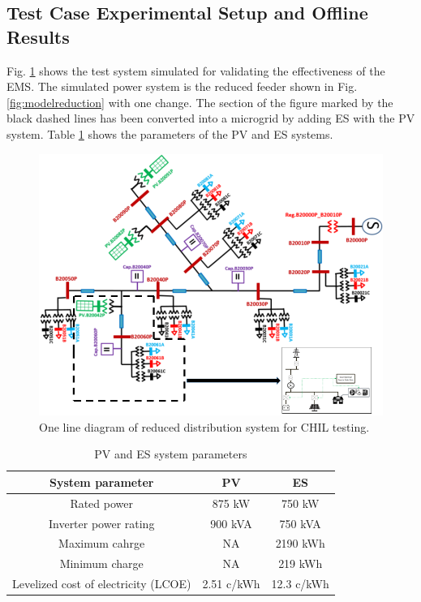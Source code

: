 \subsection{Test Case Experimental Setup and Offline Results}
Fig. \ref{fig:simulation_grid} shows the test system simulated for validating the effectiveness of the EMS. The simulated power system is the reduced feeder shown in Fig. \ref{fig:modelreduction} with one change. The section of the figure marked by the black dashed lines has been converted into a microgrid by adding ES with the PV system. Table \ref{tab:SYSTEM} shows the parameters of the PV and ES systems.
\begin{figure}[!ht]
    \centering
    \includegraphics[width = \linewidth]{figs/simulation_grid.png}
    \caption{One line diagram of reduced distribution system for CHIL testing.}
    \label{fig:simulation_grid}
\end{figure}


\begin{table}[htb]
\caption{PV and ES system parameters}
\label{tab:SYSTEM}
\centering
\begin{tabular}{|c|c|c|}
\hline
\textbf{System parameter}            & \textbf{PV} & \textbf{ES} \\ \hline
Rated power                          & 875 kW      & 750 kW      \\ \hline
Inverter power rating                & 900 kVA     & 750 kVA     \\ \hline
Maximum cahrge                       & NA          & 2190 kWh    \\ \hline
Minimum charge                       & NA          & 219 kWh     \\ \hline
Levelized cost of electricity (LCOE) & 2.51 c/kWh  & 12.3 c/kWh  \\ \hline
\end{tabular}
\end{table}


